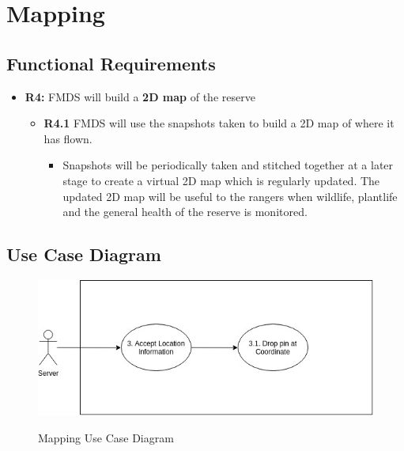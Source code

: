 \section{Mapping}

\subsection{Functional Requirements}

	\begin{flushleft}
		\begin{itemize}
			\item{\textbf{R4:}} FMDS will build a \textbf{2D map} of the reserve

				\begin{itemize}
					\item{\textbf{R4.1}} FMDS will use the snapshots taken to build a 2D map of where it has flown.
						\begin{itemize}
							\item Snapshots will be periodically taken and stitched together at a later stage to create a virtual 2D map which is regularly updated. The updated 2D map will be useful to the rangers when wildlife, plantlife and the general health of the reserve is monitored.
						\end{itemize} 
				\end{itemize}
		\end{itemize}
	\end{flushleft}

\subsection{Use Case Diagram}
	\begin{center}
		\begin{flushleft}
			\begin{figure}[h!]
				\centering
				\includegraphics[scale=0.45]{./assets/images/mapping-ucd.jpg}
				\label{fig: object-recognition-ucd }
				\caption{Mapping Use Case Diagram}
			\end{figure}
		\end{flushleft}
	\end{center}

